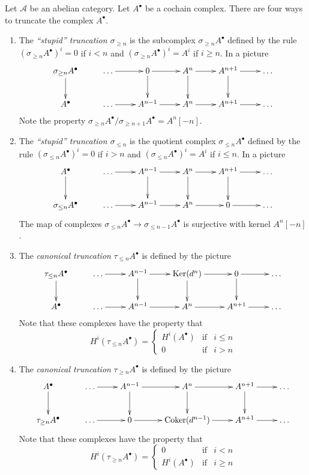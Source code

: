 \noindent
Let $\mathcal{A}$ be an abelian category.
Let $A^\bullet$ be a cochain complex. There
are four ways to truncate the complex $A^\bullet$.
\begin{enumerate}
\item The {\it ``stupid'' truncation $\sigma_{\geq n}$} is the subcomplex
$\sigma_{\geq n} A^\bullet$ defined by the rule
$(\sigma_{\geq n} A^\bullet)^i = 0$ if
$i < n$ and $(\sigma_{\geq n} A^\bullet)^i = A^i$ if
$i \geq n$. In a picture
$$
\xymatrix{
\sigma_{\geq n}A^\bullet \ar[d]  &
\ldots \ar[r] &
0 \ar[r] \ar[d] &
A^n \ar[r] \ar[d] &
A^{n + 1} \ar[r] \ar[d] &
\ldots \\
A^\bullet  &
\ldots \ar[r] &
A^{n - 1} \ar[r] &
A^n \ar[r] &
A^{n + 1} \ar[r] &
\ldots
}
$$
Note the property
$\sigma_{\geq n}A^\bullet / \sigma_{\geq n + 1}A^\bullet
= A^n[-n]$.
\item The {\it ``stupid'' truncation $\sigma_{\leq n}$}
is the quotient complex $\sigma_{\leq n} A^\bullet$ defined
by the rule $(\sigma_{\leq n} A^\bullet)^i = 0$ if
$i > n$ and $(\sigma_{\leq n} A^\bullet)^i = A^i$ if
$i \leq n$. In a picture
$$
\xymatrix{
A^\bullet \ar[d]  &
\ldots \ar[r] &
A^{n - 1} \ar[r] \ar[d] &
A^n \ar[r] \ar[d] &
A^{n + 1} \ar[r] \ar[d] &
\ldots \\
\sigma_{\leq n}A^\bullet &
\ldots \ar[r] &
A^{n - 1} \ar[r] &
A^n \ar[r] &
0 \ar[r] &
\ldots \\
}
$$
The map of complexes
$\sigma_{\leq n}A^\bullet \to \sigma_{\leq n - 1}A^\bullet$ is surjective
with kernel $A^n[-n]$.
\item The {\it canonical truncation} $\tau_{\leq n}A^\bullet$
is defined by the picture
$$
\xymatrix{
\tau_{\leq n}A^\bullet \ar[d]  &
\ldots \ar[r] &
A^{n - 1} \ar[r] \ar[d] &
\Ker(d^n) \ar[r] \ar[d] &
0 \ar[r] \ar[d] &
\ldots \\
A^\bullet  &
\ldots \ar[r] &
A^{n - 1} \ar[r] &
A^n \ar[r] &
A^{n + 1} \ar[r] &
\ldots
}
$$
Note that these complexes have the property that
$$
H^i(\tau_{\leq n}A^\bullet) =
\left\{
\begin{matrix}
H^i(A^\bullet) & \text{if} & i \leq n \\
0 & \text{if} & i > n
\end{matrix}
\right.
$$
\item The {\it canonical truncation} $\tau_{\geq n}A^\bullet$
is defined by the picture
$$
\xymatrix{
A^\bullet \ar[d] &
\ldots \ar[r] &
A^{n - 1} \ar[r] \ar[d] &
A^n \ar[r] \ar[d] &
A^{n + 1} \ar[r] \ar[d] &
\ldots \\
\tau_{\geq n}A^\bullet &
\ldots \ar[r] &
0 \ar[r] &
\Coker(d^{n - 1}) \ar[r] &
A^{n + 1} \ar[r] &
\ldots
}
$$
Note that these complexes have the property that
$$
H^i(\tau_{\geq n}A^\bullet) =
\left\{
\begin{matrix}
0 & \text{if} & i < n \\
H^i(A^\bullet) & \text{if} & i \geq n
\end{matrix}
\right.
$$
\end{enumerate}
